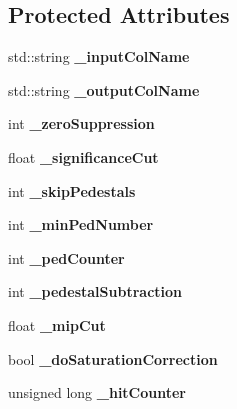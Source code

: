 \subsection*{Protected Attributes}
\begin{DoxyCompactItemize}
\item 
std::string {\bfseries \_\-inputColName}\label{classCALICE_1_1IntegratedHcalCalibrationProcessor_ad9b166089f6501b37a89d13c0a25bb2e}

\item 
std::string {\bfseries \_\-outputColName}\label{classCALICE_1_1IntegratedHcalCalibrationProcessor_a7b272632e6fd4e847dbb9dee88b7ceb8}

\item 
int {\bfseries \_\-zeroSuppression}\label{classCALICE_1_1IntegratedHcalCalibrationProcessor_a50776188b69d33bec8a734fcc082b22b}

\item 
float {\bfseries \_\-significanceCut}\label{classCALICE_1_1IntegratedHcalCalibrationProcessor_a0f9dbdb9a4ebc2b7955679cc64e19636}

\item 
int {\bfseries \_\-skipPedestals}\label{classCALICE_1_1IntegratedHcalCalibrationProcessor_a55d12f2aaaab3f29212109bfde96b759}

\item 
int {\bfseries \_\-minPedNumber}\label{classCALICE_1_1IntegratedHcalCalibrationProcessor_a2d709e61047bcb4cfbad62fde9d140df}

\item 
int {\bfseries \_\-pedCounter}\label{classCALICE_1_1IntegratedHcalCalibrationProcessor_ae916fee0673eb80e5acc3fdb73adc24a}

\item 
int {\bfseries \_\-pedestalSubtraction}\label{classCALICE_1_1IntegratedHcalCalibrationProcessor_a1c0d957bc70006c6f071d53799da2c5f}

\item 
float {\bfseries \_\-mipCut}\label{classCALICE_1_1IntegratedHcalCalibrationProcessor_a5670d938f278f3d4d66fbf481f0ec4c4}

\item 
bool {\bfseries \_\-doSaturationCorrection}\label{classCALICE_1_1IntegratedHcalCalibrationProcessor_aa022999f9178f6b1a8ea7575362fe8d1}

\item 
unsigned long {\bfseries \_\-hitCounter}\label{classCALICE_1_1IntegratedHcalCalibrationProcessor_a68d73faf87415a4af9a6e3a0f35476e8}


\end{DoxyCompactItemize}
